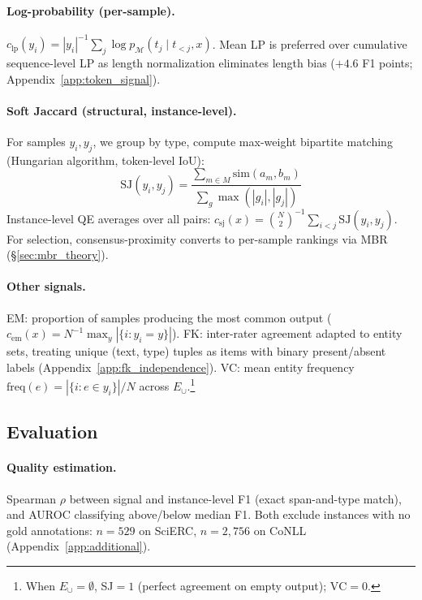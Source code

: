 \paragraph{Log-probability (per-sample).}
$c_{\text{lp}}(y_i) = |y_i|^{-1} \sum_{j} \log p_{\mathcal{M}}(t_j \mid t_{<j}, x)$.
Mean LP is preferred over cumulative sequence-level LP as length normalization eliminates length bias ($+4.6$ F1 points; Appendix~\ref{app:token_signal}).

\paragraph{Soft Jaccard (structural, instance-level).}
For samples $y_i, y_j$, we group by type, compute max-weight bipartite matching (Hungarian algorithm, token-level IoU):
\begin{equation}\label{eq:sj}
\text{SJ}(y_i, y_j) = \frac{\sum_{m \in M} \text{sim}(a_m, b_m)}{\sum_{g} \max(|g_i|, |g_j|)}
\end{equation}
Instance-level QE averages over all pairs: $c_{\text{sj}}(x) = \binom{N}{2}^{-1} \sum_{i<j} \text{SJ}(y_i, y_j)$.
For selection, consensus-proximity converts to per-sample rankings via MBR (\S\ref{sec:mbr_theory}).

\paragraph{Other signals.}
EM: proportion of samples producing the most common output ($c_{\text{em}}(x) = N^{-1} \max_{y} |\{i : y_i = y\}|$).
FK: inter-rater agreement \cite{fleiss1971agreement} adapted to entity sets, treating unique (text, type) tuples as items with binary present/absent labels (Appendix~\ref{app:fk_independence}).
VC: mean entity frequency $\text{freq}(e) = |\{i : e \in y_i\}| / N$ across $E_\cup$.\footnote{When $E_\cup = \emptyset$, SJ${=}1$ (perfect agreement on empty output); $\text{VC}{=}0$.}

\subsection{Evaluation}\label{sec:evaluation}

\paragraph{Quality estimation.}
Spearman $\rho$ between signal and instance-level F1 (exact span-and-type match), and AUROC classifying above/below median F1.
Both exclude instances with no gold annotations: $n{=}529$ on SciERC, $n{=}2{,}756$ on CoNLL (Appendix~\ref{app:additional}).

